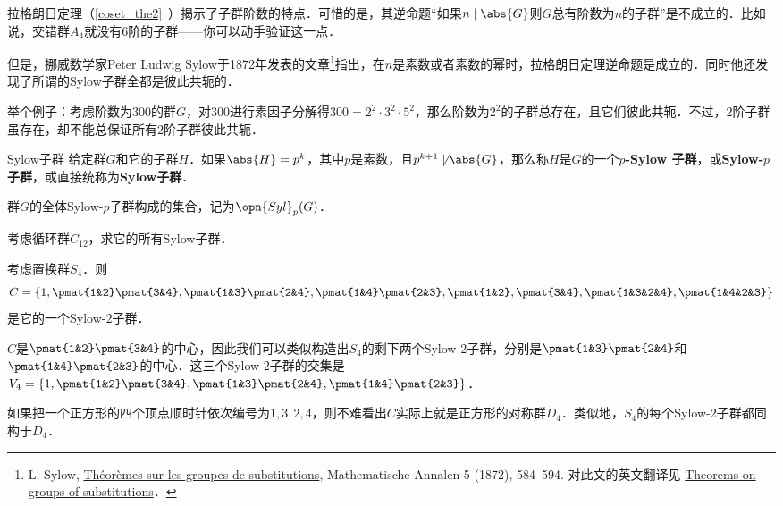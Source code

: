 


拉格朗日定理（\autoref{coset_the2}~）揭示了子群阶数的特点．可惜的是，其逆命题“如果$n\mid \abs{G}$则$G$总有阶数为$n$的子群”是不成立的．比如说，交错群$A_4$就没有$6$阶的子群——你可以动手验证这一点．

但是，挪威数学家Peter Ludwig Sylow于1872年发表的文章\footnote{L. Sylow, \href{https://eudml.org/doc/156588}{Théorèmes sur les groupes de substitutions}, Mathematische Annalen 5 (1872), 584–594. 对此文的英文翻译见 \href{http://www.maths.qmul.ac.uk/~raw/pubs_files/Sylow.pdf}{Theorems on groups of substitutions}．}指出，在$n$是素数或者素数的幂时，拉格朗日定理逆命题是成立的．同时他还发现了所谓的Sylow子群全都是彼此共轭的．

举个例子：考虑阶数为$300$的群$G$，对$300$进行素因子分解得$300=2^2\cdot 3^2\cdot 5^2$，那么阶数为$2^2$的子群总存在，且它们彼此共轭．不过，$2$阶子群虽存在，却不能总保证所有$2$阶子群彼此共轭．


\begin{definition}{Sylow子群}\label{Sylow_def1}
给定群$G$和它的子群$H$．如果$\abs{H}=p^k$，其中$p$是素数，且$p^{k+1}\not\mid\abs{G}$，那么称$H$是$G$的一个$p$\textbf{-Sylow 子群}，或\textbf{Sylow-}$p$\textbf{子群}，或直接统称为\textbf{Sylow子群}．

群$G$的全体Sylow-$p$子群构成的集合，记为$\opn{Syl}_p(G)$．
\end{definition}



\begin{exercise}{}
考虑循环群$C_{12}$，求它的所有Sylow子群．
\end{exercise}

\begin{example}{}
考虑置换群$S_4$．则
\begin{equation}
C=\{1, \pmat{1&2}\pmat{3&4}, \pmat{1&3}\pmat{2&4}, \pmat{1&4}\pmat{2&3}, \pmat{1&2}, \pmat{3&4}, \pmat{1&3&2&4}, \pmat{1&4&2&3}\}
\end{equation}
是它的一个Sylow-$2$子群．

$C$是$\pmat{1&2}\pmat{3&4}$的中心，因此我们可以类似构造出$S_4$的剩下两个Sylow-$2$子群，分别是$\pmat{1&3}\pmat{2&4}$和$\pmat{1&4}\pmat{2&3}$的中心．这三个Sylow-$2$子群的交集是$V_4=\{1, \pmat{1&2}\pmat{3&4}, \pmat{1&3}\pmat{2&4}, \pmat{1&4}\pmat{2&3}\}$．

如果把一个正方形的四个顶点顺时针依次编号为$1, 3, 2, 4$，则不难看出$C$实际上就是正方形的对称群$D_4$．类似地，$S_4$的每个Sylow-$2$子群都同构于$D_4$．

\end{example}

